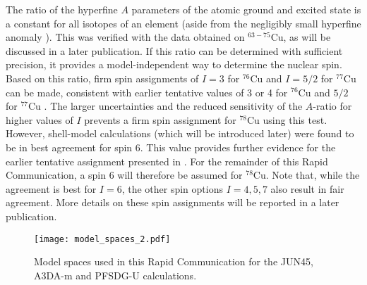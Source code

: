 \documentclass[reprint,superscriptaddress,amsmath,amssymb,aps,prl]{revtex4-1}
\begin{document}
The ratio of the hyperfine $A$ parameters of the atomic ground and excited state is a constant for all isotopes of an element (aside from the negligibly small hyperfine anomaly \cite{Bucka1967,Locher1974}). This was verified with the data obtained on $^{63-75}$Cu, as will be discussed in a later publication. If this ratio can be determined with sufficient precision, it provides a model-independent way to determine the nuclear spin. Based on this ratio, firm spin assignments of $I=3$ for $^{76}$Cu and $I=5/2$ for $^{77}$Cu can be made, consistent with earlier tentative values of 3 or 4 for $^{76}$Cu \cite{VanRoosbroeck2005} and $5/2$ for $^{77}$Cu \cite{Patronis2009,Ilyushkin2009,Koster2011}. The larger uncertainties and the reduced sensitivity of the $A$-ratio for higher values of $I$ prevents a firm spin assignment for $^{78}$Cu using this test. However, shell-model calculations (which will be introduced later) were found to be in best agreement for spin 6. This value provides further evidence for the earlier tentative assignment presented in \cite{gross2009}. For the remainder of this Rapid Communication, a spin 6 will therefore be assumed for $^{78}$Cu. Note that, while the agreement is best for $I=6$, the other spin options $I=4,5,7$ also result in fair agreement. More details on these spin assignments will be reported in a later publication.

\begin{figure}[ht!]
\centering
    \texttt{[image: model\_spaces\_2.pdf]}
    \caption{Model spaces used in this Rapid Communication for the JUN45, A3DA-m and PFSDG-U calculations.}
    \label{fig:model_spaces}
\end{figure}
\end{document}
